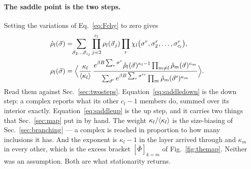 \paragraph{The saddle point is the two steps.} Setting the variations of
Eq.~\eqref{eq:Fchy} to zero gives
\begin{align}
  \hat\rho_{l}(\vec\sigma)&=\!\!\sum_{\vec\sigma_{2}\dots\vec\sigma_{c_{l}}}
    \prod_{j=2}^{c_{l}}\rho_{l}(\vec\sigma_{j})
    \prod_{r}\chi_{l}\bigl(\sigma^{r},\sigma^{r}_{2},\dots,
      \sigma^{r}_{c_{l}}\bigr),\label{eq:saddledown}\\
  \rho_{l}(\vec\sigma)&=\Bigl\langle\frac{\kappa_{l}}{\langle \kappa_{l} \rangle}\,
    \frac{e^{\beta B\sum_{r}\sigma^{r}}\hat\rho_{l}(\vec\sigma)^{\kappa_{l}-1}
          \prod_{m\ne l}\hat\rho_{m}(\vec\sigma)^{\kappa_{m}}}
         {\sum_{\vec\sigma'}e^{\beta B\sum_{r}\sigma'^{r}}
          \prod_{m}\hat\rho_{m}(\vec\sigma')^{\kappa_{m}}}\Bigr\rangle.
  \label{eq:saddleup}
\end{align}
Read them against Sec.~\ref{sec:twosteps}. Equation~\eqref{eq:saddledown} is the
down step: a complex reports what its other $c_{l}-1$ members do, summed over
its interior exactly. Equation~\eqref{eq:saddleup} is the up step, and it
carries two things that Sec.~\ref{sec:map} put in by hand. The weight
$\kappa_{l}/\langle \kappa_{l} \rangle$ is the size-biasing of
Sec.~\ref{sec:branching} --- a complex is reached in proportion to how many
inclusions it has. And the exponent is $\kappa_{l}-1$ in the layer arrived
through and $\kappa_{m}$ in every other, which is the excess bracket
$[\bar\Phi]_{k=m}$ of Fig.~\ref{fig:themap}. Neither was an assumption. Both
are what stationarity returns.

